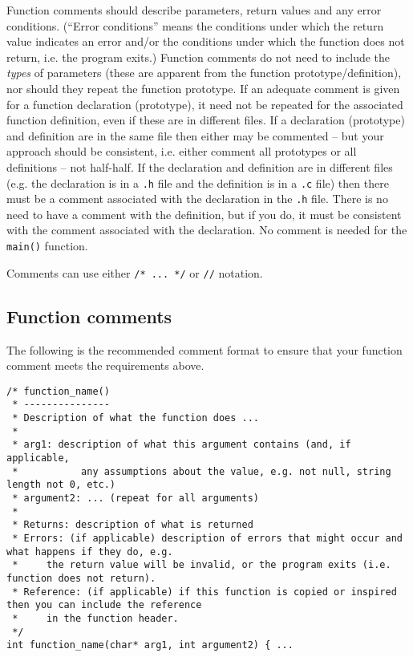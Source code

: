 \documentclass{article}
\begin{document}
Function comments should describe parameters, return values and any error conditions. (``Error conditions'' means
the conditions under which the return value indicates an error and/or the conditions under which the 
function does not return, i.e. the program exits.)
Function comments do not need to include the \textit{types} of parameters (these are apparent from the function prototype/definition), 
nor should they repeat the function prototype. If an adequate comment is given for a function 
declaration (prototype), it need not be repeated for the associated function definition, even if these are in 
different files. If a declaration (prototype) and
definition are in the same file then either may be commented -- but your approach should be consistent, i.e. either comment
all prototypes or all definitions -- not half-half. If the declaration and definition are in different files
(e.g. the declaration is in a \texttt{.h} file and the definition is in a \texttt{.c} file) then there must be a comment
associated with the declaration in the \texttt{.h} file. There is no need to have a comment with the definition, 
but if you do, it must be consistent with the comment associated with the declaration.
No comment is needed for the \texttt{main()} function.

Comments can use either \texttt{/* ... */} or \texttt{//} notation.

\subsection{Function comments}
The following is the recommended comment format to ensure that your function comment meets the requirements above.
\begin{lstlisting}
/* function_name()
 * ---------------
 * Description of what the function does ...
 *
 * arg1: description of what this argument contains (and, if applicable, 
 *           any assumptions about the value, e.g. not null, string length not 0, etc.)
 * argument2: ... (repeat for all arguments)
 *
 * Returns: description of what is returned
 * Errors: (if applicable) description of errors that might occur and what happens if they do, e.g.
 *     the return value will be invalid, or the program exits (i.e. function does not return). 
 * Reference: (if applicable) if this function is copied or inspired then you can include the reference
 *     in the function header.
 */
int function_name(char* arg1, int argument2) { ...
\end{lstlisting}
\end{document}
